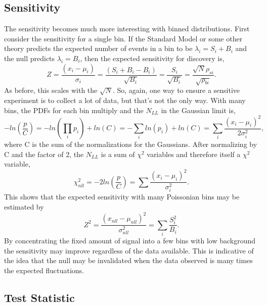 \subsection{Sensitivity}
\label{sensitivity}

The sensitivity becomes much more interesting with binned distributions. First consider the sensitivity for a single bin. If the Standard Model or some other theory predicts the expected number of events in a bin to be $\lambda_i=S_i+B_i$ and the null predicts $\lambda_i=B_i$, then the expected sensitivity for discovery is,
\begin{equation}
Z = \frac{(x_i-\mu_i)}{\sigma_i} = \frac{(S_i+B_i-B_i)}{\sqrt{B_i}} = \frac{S_i}{\sqrt{B_i}} = \frac{\sqrt{N}\rho_{si}}{\sqrt{\rho_{bi}}}.
\end{equation}
As before, this scales with the $\sqrt{N}$. So, again, one way to ensure a sensitive experiment is to collect a lot of data, but that's not the only way. With many bins, the PDFs for each bin multiply and the $N_{LL}$ in the Gaussian limit is,
\begin{equation}
\label{eq:norm}
-ln\left(\frac{p}{C}\right) = -ln\left(\prod_i p_i\right) + ln\left( C \right) 
                            = -\sum_i ln\left(p_i\right) + ln\left( C \right) 
                            = \sum_i \frac{(x_i-\mu_i)^2}{2\sigma_i^2},
\end{equation}
where C is the sum of the normalizations for the Gaussians. After normalizing by C and the factor of 2, the $N_{LL}$ is a sum of $\chi^2$ variables and therefore itself a $\chi^2$ variable, 
\begin{equation}
\chi^2_{nll} = -2ln\left(\frac{p}{C}\right) = \sum \frac{(x_i-\mu_i)^2}{\sigma_i^2}.
\end{equation}
This shows that the expected sensitivity with many Poissonian bins may be estimated by
\begin{equation}
Z^2 = \frac{(x_{nll}-\mu_{nll})^2}{\sigma_{nll}^2} = \sum_i \frac{S_i^2}{B_i}.  
\end{equation}
By concentrating the fixed amount of signal into a few bins with low background the sensitivity may improve regardless of the data available. This is indicative of the idea that the null may be invalidated when the data observed is many times the expected fluctuations.

\subsection{Test Statistic}

